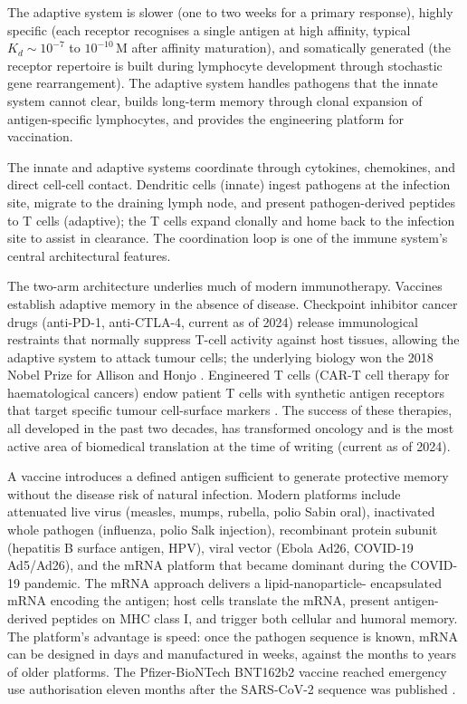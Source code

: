  The adaptive system is slower
(one to two weeks for a primary response), highly specific (each
receptor recognises a single antigen at high affinity, typical
$K_d \sim 10^{-7}$ to $10^{-10}\,\text{M}$ after affinity maturation),
and somatically generated (the receptor repertoire is built during
lymphocyte development through stochastic gene rearrangement). The
adaptive system handles pathogens that the innate system cannot
clear, builds long-term memory through clonal expansion of
antigen-specific lymphocytes, and provides the engineering platform
for vaccination.

 The innate and adaptive systems coordinate
through cytokines, chemokines, and direct cell-cell contact.
Dendritic cells (innate) ingest pathogens at the infection site,
migrate to the draining lymph node, and present pathogen-derived
peptides to T cells (adaptive); the T cells expand clonally and home
back to the infection site to assist in clearance. The coordination
loop is one of the immune system's central architectural features.

 The two-arm architecture underlies
much of modern immunotherapy. Vaccines establish adaptive memory in
the absence of disease. Checkpoint inhibitor cancer drugs (anti-PD-1,
anti-CTLA-4, current as of 2024) release immunological restraints
that normally suppress T-cell activity against host tissues, allowing
the adaptive system to attack tumour cells; the underlying biology
won the 2018 Nobel Prize for Allison and Honjo
\cite{paper:v6c07-allison-2018-nobel}. Engineered T cells (CAR-T
cell therapy for haematological cancers) endow patient T cells with
synthetic antigen receptors that target specific tumour cell-surface
markers \cite{paper:v6c07-june-cart-2018}. The success of these
therapies, all developed in the past two decades, has transformed
oncology and is the most active area of biomedical translation at
the time of writing (current as of 2024).

 A vaccine introduces a defined antigen
sufficient to generate protective memory without the disease risk of
natural infection. Modern platforms include attenuated live virus
(measles, mumps, rubella, polio Sabin oral), inactivated whole
pathogen (influenza, polio Salk injection), recombinant protein
subunit (hepatitis B surface antigen, HPV), viral vector
(Ebola Ad26, COVID-19 Ad5/Ad26), and the mRNA platform
\cite{paper:v6c07-mrna-pfizer-2020} that became dominant during the
COVID-19 pandemic. The mRNA approach delivers a lipid-nanoparticle-
encapsulated mRNA encoding the antigen; host cells translate the
mRNA, present antigen-derived peptides on MHC class I, and trigger
both cellular and humoral memory. The platform's advantage is speed:
once the pathogen sequence is known, mRNA can be designed in days
and manufactured in weeks, against the months to years of older
platforms. The Pfizer-BioNTech BNT162b2 vaccine reached emergency use
authorisation eleven months after the SARS-CoV-2 sequence was
published \cite{paper:v6c07-mrna-pfizer-2020}.

